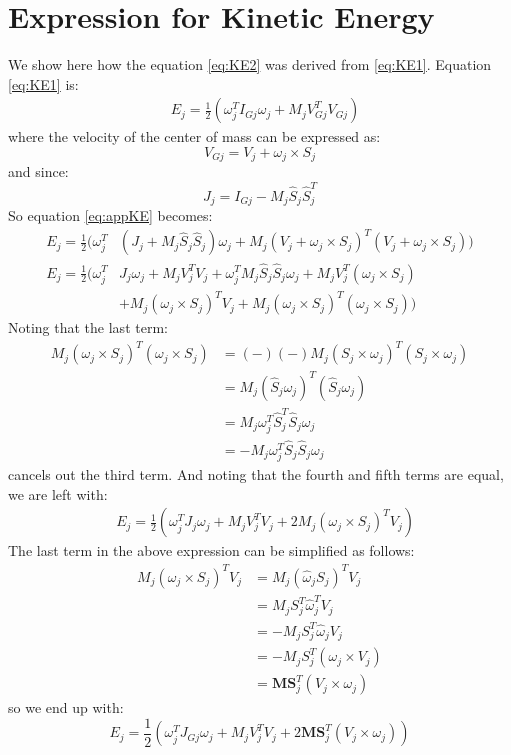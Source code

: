 \documentclass[a4paper,10pt]{article}
\begin{document}



\appendix
\section{Expression for Kinetic Energy} \label{sec:expressionKE}
We show here how the equation \ref{eq:KE2} was derived from \ref{eq:KE1}. Equation \ref{eq:KE1} is:
\begin{align}
 &E_j = \frac{1}{2}(\omega_j^TI_{Gj}\omega_j+M_jV_{Gj}^TV_{Gj}) \label{eq:appKE}
\end{align} where the velocity of the center of mass can be expressed as:
\[
 V_{Gj} = V_j + \omega_j \times S_j
\] and since:
\[
 J_j = I_{Gj} - M_j \hat{S}_j \hat{S}_j^T
\] So equation \ref{eq:appKE} becomes:
\begin{align*}
 E_j = \frac{1}{2}(\omega_j^T&(J_j + M_j \hat{S}_j \hat{S}_j)\omega_j+M_j(V_j + \omega_j \times S_j)^T(V_j + \omega_j \times S_j)) \\
 E_j = \frac{1}{2}(\omega_j^T&J_j\omega_j+M_jV_j^TV_j+ \omega_j^TM_j\hat{S}_j\hat{S}_j\omega_j+M_jV_j^T(\omega_j\times S_j) \nonumber \\
 &+ M_j(\omega_j \times S_j)^TV_j+M_j(\omega_j \times S_j)^T(\omega_j \times S_j)) 
\end{align*} Noting that the last term:
\begin{align*}
 M_j(\omega_j \times S_j)^T(\omega_j \times S_j) &= (-)(-)M_j(S_j \times \omega_j)^T(S_j \times \omega_j) \\ &= M_j(\hat{S}_j\omega_j)^T(\hat{S}_j\omega_j) \\ &= M_j\omega_j^T\hat{S}_j^T\hat{S}_j\omega_j \\ &= -M_j\omega_j^T\hat{S}_j\hat{S}_j\omega_j
\end{align*} cancels out the third term. And noting that the fourth and fifth terms are equal, we are left with:
\begin{align*}
 &E_j = \frac{1}{2}(\omega_j^TJ_j\omega_j+M_jV_j^TV_j+ 2M_j(\omega_j\times S_j)^TV_j) 
\end{align*} The last term in the above expression can be simplified as follows:
\begin{align*}
 M_j(\omega_j\times S_j)^TV_j &= M_j(\hat{\omega}_jS_j)^TV_j \\ &= M_jS_j^T\hat{\omega}_j^TV_j \\ &= -M_jS_j^T\hat{\omega}_jV_j \\ &= -M_jS_j^T(\omega_j \times V_j) \\ &= \mathbf{MS}_j^T(V_j \times \omega_j)
\end{align*} so we end up with:
\[
 E_j = \frac{1}{2}(\omega_j^TJ_{Gj}\omega_j+M_jV_j^TV_j + 2\mathbf{MS}_j^T(V_j \times \omega_j))
\]
\end{document}
